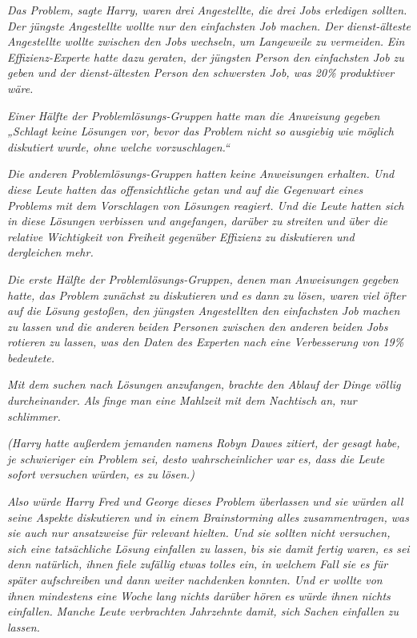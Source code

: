 {\emph{Das Problem, sagte Harry, waren drei Angestellte, die drei Jobs erledigen sollten. Der jüngste Angestellte wollte nur den einfachsten Job machen. Der dienst-älteste Angestellte wollte zwischen den Jobs wechseln, um Langeweile zu vermeiden.} \emph{Ein Effizienz-Experte hatte dazu geraten, der jüngsten Person den einfachsten Job zu geben und der dienst-ältesten Person den schwersten Job, was 20\% produktiver wäre.}

\emph{\emph{Einer}} \emph{Hälfte der Problemlösungs-Gruppen hatte man die Anweisung gegeben „Schlagt keine Lösungen vor, bevor das Problem nicht so ausgiebig wie möglich diskutiert wurde, ohne welche vorzuschlagen.“}

\emph{Die anderen Problemlösungs-Gruppen hatten keine Anweisungen erhalten. Und diese Leute hatten} \emph{das offensichtliche getan und auf die Gegenwart eines Problems mit dem} \emph{Vorschlagen von Lösungen reagiert. Und die Leute hatten sich in diese Lösungen verbissen und angefangen, darüber zu streiten und über die relative Wichtigkeit von Freiheit gegenüber Effizienz zu diskutieren und dergleichen mehr.}

\emph{Die erste Hälfte der Problemlösungs-Gruppen, denen man Anweisungen gegeben hatte, das Problem zunächst zu} \emph{\emph{diskutieren}} \emph{und es} \emph{\emph{dann}} \emph{zu lösen, waren viel öfter auf die Lösung gestoßen, den jüngsten Angestellten den einfachsten Job machen zu lassen und die anderen beiden Personen zwischen den anderen beiden Jobs rotieren zu lassen, was den Daten des Experten nach eine Verbesserung von 19\% bedeutete.}

\emph{Mit dem suchen nach Lösungen anzufangen, brachte} \emph{\emph{den Ablauf}} \emph{der Dinge} \emph{\emph{völlig durcheinander.}} \emph{Als finge man eine Mahlzeit mit dem Nachtisch} \emph{an, nur} \emph{\emph{schlimmer.}}

\emph{(Harry hatte außerdem jemanden namens Robyn Dawes zitiert, der gesagt habe, je schwieriger ein Problem sei, desto wahrscheinlicher war es, dass die Leute sofort versuchen würden, es zu lösen.)}

\emph{Also würde Harry Fred und George dieses Problem überlassen und sie würden all seine Aspekte diskutieren und in einem Brainstorming alles zusammentragen, was sie auch nur ansatzweise für relevant hielten. Und sie sollten nicht versuchen, sich eine tatsächliche Lösung einfallen zu lassen, bis sie damit fertig waren, es sei denn natürlich, ihnen} \emph{\emph{fiele}} \emph{zufällig etwas} \emph{tolles ein, in welchem Fall sie es für später aufschreiben und dann weiter nachdenken konnten. Und er wollte von ihnen mindestens eine Woche lang nichts darüber hören} \emph{\emph{es würde ihnen nichts einfallen.}} \emph{Manche Leute verbrachten} \emph{\emph{Jahrzehnte}} \emph{damit, sich Sachen einfallen zu lassen.}

}
